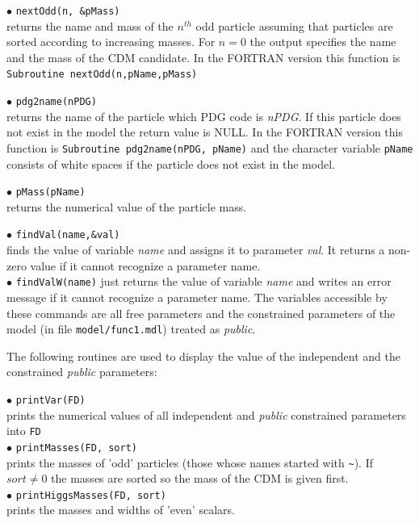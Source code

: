 \documentclass[12pt,a4paper]{article}
\begin{document}
\noindent
$\bullet$  \verb|nextOdd(n, &pMass)| \\
returns the name and mass of the $n^{th}$ odd particle assuming that particles are 
sorted according to increasing masses. For $n=0$ the output specifies the 
name and the mass of the CDM candidate. In the FORTRAN version this function 
is \verb|Subroutine nextOdd(n,pName,pMass)| 

\noindent
$\bullet$  \verb|pdg2name(nPDG)| \\
returns  the name of  the particle which PDG code is {\it nPDG}. If this particle does not exist in the model
the return value is NULL.  In the FORTRAN version this function
is \verb|Subroutine pdg2name(nPDG, pName)| and the character variable
\verb|pName| consists of white
spaces if the particle does not exist in the model. 

\noindent
$\bullet$  \verb|pMass(pName)| \\
returns  the numerical value of the particle mass.

\noindent
$\bullet$ \verb|findVal(name,&val)|\\
 finds the  value of
 variable  {\it name} and assigns it to parameter {\it val}. It returns a non-zero
value  if it cannot recognize  a parameter name. \\
$\bullet$ \verb|findValW(name)| 
just returns the value of variable {\it name} and writes an error message
if it cannot recognize  a parameter name.
The variables accessible by these commands are all free parameters and   the 
constrained parameters of the model (in file \verb|model/func1.mdl|)
treated as {\it public}. 

The following routines are used to display the value of the independent and the constrained 
{\it public}
parameters: 


\noindent
$\bullet$ \verb|printVar(FD)|\\ 
prints the numerical values of all independent and {\it public} 
constrained parameters into \verb|FD|\\
$\bullet$ \verb|printMasses(FD, sort)|\\
 prints the masses of 'odd' particles
(those whose names  started with \verb|~|). If $sort\ne 0$
the masses are sorted so the mass of the CDM is given first.\\
$\bullet$ \verb|printHiggsMasses(FD, sort)|\\
prints the masses and widths of 'even' scalars.\\
\end{document}
